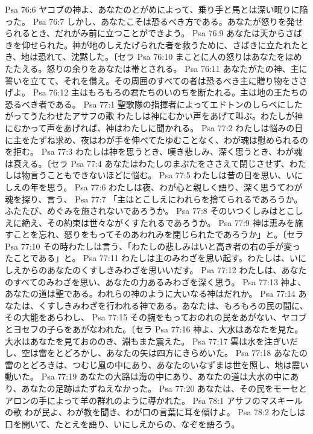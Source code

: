 Psa 76:6  ヤコブの神よ、あなたのとがめによって、乗り手と馬とは深い眠りに陥った。
Psa 76:7  しかし、あなたこそは恐るべき方である。あなたが怒りを発せられるとき、だれがみ前に立つことができよう。
Psa 76:9  あなたは天からさばきを仰せられた。神が地のしえたげられた者を救うために、さばきに立たれたとき、地は恐れて、沈黙した。〔セラ
Psa 76:10  まことに人の怒りはあなたをほめたたえる。怒りの余りをあなたは帯とされる。
Psa 76:11  あなたがたの神、主に誓いを立てて、それを償え。その周囲のすべての者は恐るべき主に贈り物をささげよ。
Psa 76:12  主はもろもろの君たちのいのちを断たれる。主は地の王たちの恐るべき者である。
Psa 77:1  聖歌隊の指揮者によってエドトンのしらべにしたがってうたわせたアサフの歌 わたしは神にむかい声をあげて叫ぶ。わたしが神にむかって声をあげれば、神はわたしに聞かれる。
Psa 77:2  わたしは悩みの日に主をたずね求め、夜はわが手を伸べてたゆむことなく、わが魂は慰められるのを拒む。
Psa 77:3  わたしは神を思うとき、嘆き悲しみ、深く思うとき、わが魂は衰える。〔セラ
Psa 77:4  あなたはわたしのまぶたをささえて閉じさせず、わたしは物言うこともできないほどに悩む。
Psa 77:5  わたしは昔の日を思い、いにしえの年を思う。
Psa 77:6  わたしは夜、わが心と親しく語り、深く思うてわが魂を探り、言う、
Psa 77:7  「主はとこしえにわれらを捨てられるであろうか。ふたたび、めぐみを施されないであろうか。
Psa 77:8  そのいつくしみはとこしえに絶え、その約束は世々ながくすたれるであろうか。
Psa 77:9  神は恵みを施すことを忘れ、怒りをもってそのあわれみを閉じられたであろうか」と。〔セラ
Psa 77:10  その時わたしは言う、「わたしの悲しみはいと高き者の右の手が変ったことである」と。
Psa 77:11  わたしは主のみわざを思い起す。わたしは、いにしえからのあなたのくすしきみわざを思いいだす。
Psa 77:12  わたしは、あなたのすべてのみわざを思い、あなたの力あるみわざを深く思う。
Psa 77:13  神よ、あなたの道は聖である。われらの神のように大いなる神はだれか。
Psa 77:14  あなたは、くすしきみわざを行われる神である。あなたは、もろもろの民の間に、その大能をあらわし、
Psa 77:15  その腕をもっておのれの民をあがない、ヤコブとヨセフの子らをあがなわれた。〔セラ
Psa 77:16  神よ、大水はあなたを見た。大水はあなたを見ておののき、淵もまた震えた。
Psa 77:17  雲は水を注ぎいだし、空は雷をとどろかし、あなたの矢は四方にきらめいた。
Psa 77:18  あなたの雷のとどろきは、つむじ風の中にあり、あなたのいなずまは世を照し、地は震い動いた。
Psa 77:19  あなたの大路は海の中にあり、あなたの道は大水の中にあり、あなたの足跡はたずねえなかった。
Psa 77:20  あなたは、その民をモーセとアロンの手によって羊の群れのように導かれた。
Psa 78:1  アサフのマスキールの歌 わが民よ、わが教を聞き、わが口の言葉に耳を傾けよ。
Psa 78:2  わたしは口を開いて、たとえを語り、いにしえからの、なぞを語ろう。
